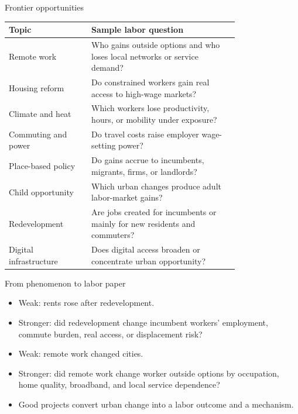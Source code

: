 \documentclass[aspectratio=169,11pt]{beamer}
\begin{document}
\begin{frame}{Frontier opportunities}
\small
\begin{tabular}{p{0.28\linewidth} p{0.50\linewidth}}
\toprule
Topic & Sample labor question \\
\midrule
Remote work & Who gains outside options and who loses local networks or service demand? \\
Housing reform & Do constrained workers gain real access to high-wage markets? \\
Climate and heat & Which workers lose productivity, hours, or mobility under exposure? \\
Commuting and power & Do travel costs raise employer wage-setting power? \\
Place-based policy & Do gains accrue to incumbents, migrants, firms, or landlords? \\
Child opportunity & Which urban changes produce adult labor-market gains? \\
Redevelopment & Are jobs created for incumbents or mainly for new residents and commuters? \\
Digital infrastructure & Does digital access broaden or concentrate urban opportunity? \\
\bottomrule
\end{tabular}
\end{frame}

\begin{frame}{From phenomenon to labor paper}
\begin{itemize}
    \item Weak: rents rose after redevelopment.
    \item Stronger: did redevelopment change incumbent workers' employment, commute burden, real access, or displacement risk?
    \item Weak: remote work changed cities.
    \item Stronger: did remote work change worker outside options by occupation, home quality, broadband, and local service dependence?
    \item Good projects convert urban change into a labor outcome and a mechanism.
\end{itemize}
\end{frame}
\end{document}
